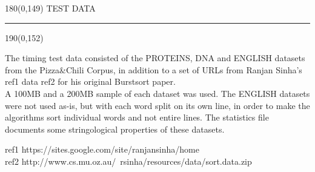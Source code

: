 %

\begin{textblock}{180}(0,149)
\sffamily\normalsize{\color{sciorange}TEST DATA}\small\\
\rule[3mm]{190mm}{0.1pt}
\end{textblock} 
\begin{textblock}{190}(0,152)
 \footnotesize 
\begin{multicols}{3}
The timing test data consisted of the PROTEINS, DNA and ENGLISH datasets from the Pizza\&Chili Corpus, in addition to a set of URLs from Ranjan Sinha's ref1 data ref2 for his original Burstsort paper. \\

A 100MB and a 200MB sample of each dataset was used. The ENGLISH datasets were not used as-is, but with each word split on its own line, in order to make the algorithms sort individual words and not entire lines. The statistics file documents some stringological properties of these datasets.

ref1 https://sites.google.com/site/ranjansinha/home \\
ref2 http://www.cs.mu.oz.au/~rsinha/resources/data/sort.data.zip \\
\end{multicols}

\end{textblock} 

